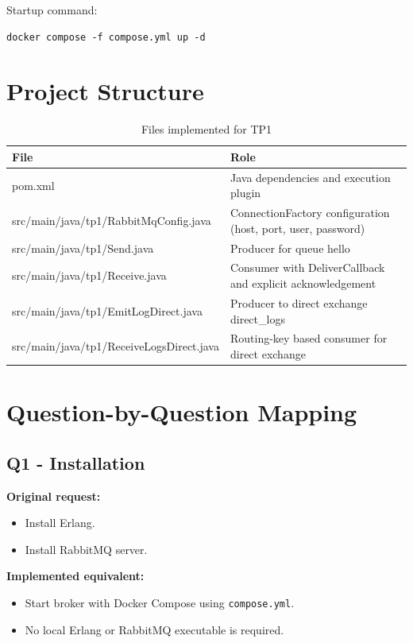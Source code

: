 \documentclass[a4paper,12pt]{article}
\begin{document}
Startup command:

\begin{lstlisting}
docker compose -f compose.yml up -d
\end{lstlisting}

\section{Project Structure}

\begin{table}[H]
\centering
\begin{tabularx}{\textwidth}{>{\ttfamily}p{} X}
\toprule
File & Role \\
\midrule
pom.xml & Java dependencies and execution plugin \\
src/main/java/tp1/RabbitMqConfig.java & ConnectionFactory configuration (host, port, user, password) \\
src/main/java/tp1/Send.java & Producer for queue hello \\
src/main/java/tp1/Receive.java & Consumer with DeliverCallback and explicit acknowledgement \\
src/main/java/tp1/EmitLogDirect.java & Producer to direct exchange direct\_logs \\
src/main/java/tp1/ReceiveLogsDirect.java & Routing-key based consumer for direct exchange \\
\bottomrule
\end{tabularx}
\caption{Files implemented for TP1}
\end{table}

\section{Question-by-Question Mapping}

\subsection{Q1 - Installation}

\textbf{Original request:}
\begin{itemize}
    \item Install Erlang.
    \item Install RabbitMQ server.
\end{itemize}

\textbf{Implemented equivalent:}
\begin{itemize}
    \item Start broker with Docker Compose using \texttt{compose.yml}.
    \item No local Erlang or RabbitMQ executable is required.
\end{itemize}
\end{document}
